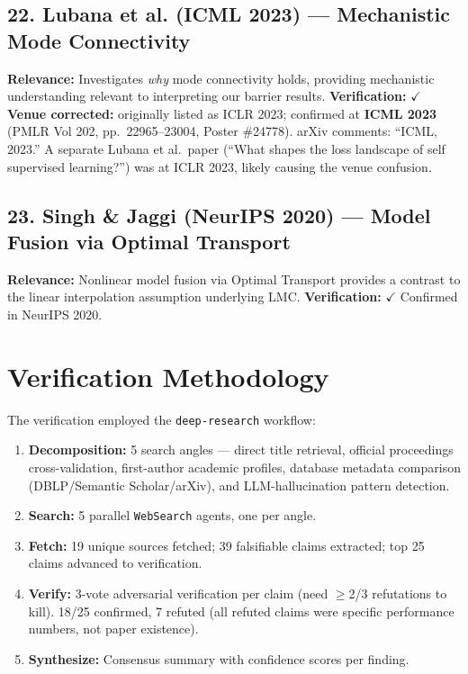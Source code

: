 \documentclass[11pt,a4paper]{article}
\begin{document}
\subsection*{22. Lubana et al. (ICML 2023) --- Mechanistic Mode Connectivity}
\textbf{Relevance:} Investigates \emph{why} mode connectivity holds, providing mechanistic understanding relevant to interpreting our barrier results. \textbf{Verification:} $\checkmark$ \textbf{Venue corrected:} originally listed as ICLR 2023; confirmed at \textbf{ICML 2023} (PMLR Vol 202, pp.\ 22965--23004, Poster \#24778). arXiv comments: ``ICML, 2023.'' A separate Lubana et al.\ paper (``What shapes the loss landscape of self supervised learning?'') was at ICLR 2023, likely causing the venue confusion.

\subsection*{23. Singh \& Jaggi (NeurIPS 2020) --- Model Fusion via Optimal Transport}
\textbf{Relevance:} Nonlinear model fusion via Optimal Transport provides a contrast to the linear interpolation assumption underlying LMC. \textbf{Verification:} $\checkmark$ Confirmed in NeurIPS 2020.

\section{Verification Methodology}

The verification employed the \texttt{deep-research} workflow:

\begin{enumerate}[leftmargin=*]
    \item \textbf{Decomposition:} 5 search angles --- direct title retrieval, official proceedings cross-validation, first-author academic profiles, database metadata comparison (DBLP/Semantic Scholar/arXiv), and LLM-hallucination pattern detection.
    \item \textbf{Search:} 5 parallel \texttt{WebSearch} agents, one per angle.
    \item \textbf{Fetch:} 19 unique sources fetched; 39 falsifiable claims extracted; top 25 claims advanced to verification.
    \item \textbf{Verify:} 3-vote adversarial verification per claim (need $\geq$2/3 refutations to kill). 18/25 confirmed, 7 refuted (all refuted claims were specific performance numbers, not paper existence).
    \item \textbf{Synthesize:} Consensus summary with confidence scores per finding.
\end{enumerate}
\end{document}
